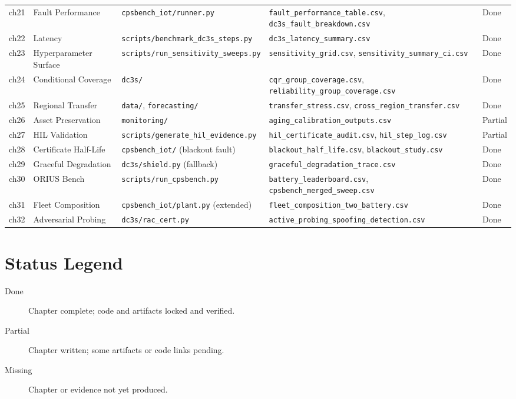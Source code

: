 \begin{small}
\begin{longtable}{@{}p{1.2cm}p{2.8cm}p{2.2cm}p{3.2cm}p{1.8cm}@{}}
ch21 & Fault Performance & \texttt{cpsbench\_iot/runner.py} & \texttt{fault\_performance\_table.csv}, \texttt{dc3s\_fault\_breakdown.csv} & Done \\
ch22 & Latency & \texttt{scripts/benchmark\_dc3s\_steps.py} & \texttt{dc3s\_latency\_summary.csv} & Done \\
ch23 & Hyperparameter Surface & \texttt{scripts/run\_sensitivity\_sweeps.py} & \texttt{sensitivity\_grid.csv}, \texttt{sensitivity\_summary\_ci.csv} & Done \\
ch24 & Conditional Coverage & \texttt{dc3s/} & \texttt{cqr\_group\_coverage.csv}, \texttt{reliability\_group\_coverage.csv} & Done \\
ch25 & Regional Transfer & \texttt{data/}, \texttt{forecasting/} & \texttt{transfer\_stress.csv}, \texttt{cross\_region\_transfer.csv} & Done \\
ch26 & Asset Preservation & \texttt{monitoring/} & \texttt{aging\_calibration\_outputs.csv} & Partial \\
ch27 & HIL Validation & \texttt{scripts/generate\_hil\_evidence.py} & \texttt{hil\_certificate\_audit.csv}, \texttt{hil\_step\_log.csv} & Partial \\
ch28 & Certificate Half-Life & \texttt{cpsbench\_iot/} (blackout fault) & \texttt{blackout\_half\_life.csv}, \texttt{blackout\_study.csv} & Done \\
ch29 & Graceful Degradation & \texttt{dc3s/shield.py} (fallback) & \texttt{graceful\_degradation\_trace.csv} & Done \\
ch30 & ORIUS Bench & \texttt{scripts/run\_cpsbench.py} & \texttt{battery\_leaderboard.csv}, \texttt{cpsbench\_merged\_sweep.csv} & Done \\
ch31 & Fleet Composition & \texttt{cpsbench\_iot/plant.py} (extended) & \texttt{fleet\_composition\_two\_battery.csv} & Done \\
ch32 & Adversarial Probing & \texttt{dc3s/rac\_cert.py} & \texttt{active\_probing\_spoofing\_detection.csv} & Done \\
\end{longtable}
\end{small}

\section{Status Legend}

\begin{description}
\item[Done] Chapter complete; code and artifacts locked and verified.
\item[Partial] Chapter written; some artifacts or code links pending.
\item[Missing] Chapter or evidence not yet produced.
\end{description}

